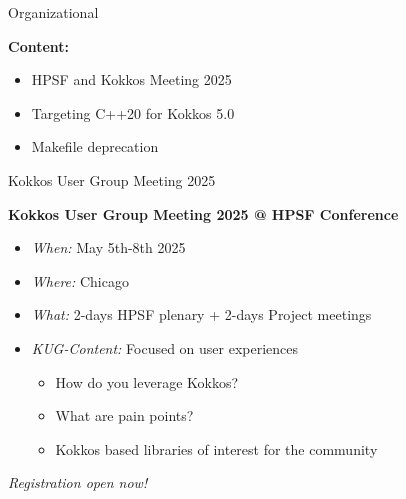

\begin{frame}[fragile]

  {\Huge Organizational}

  \vspace{10pt}

  \textbf{Content:}
  \begin{itemize}
    \item HPSF and Kokkos Meeting 2025
    \item Targeting C++20 for Kokkos 5.0
    \item Makefile deprecation
  \end{itemize}

\end{frame}


\begin{frame}[fragile]{Kokkos User Group Meeting 2025}
\begin{center}
\textbf{Kokkos User Group Meeting 2025 @ HPSF Conference}
\end{center}

\begin{itemize}
\item{\textit{When:} May 5th-8th 2025}
\item{\textit{Where:} Chicago}
\item{\textit{What:} 2-days HPSF plenary + 2-days Project meetings}
\item{\textit{KUG-Content:} Focused on user experiences
\begin{itemize}
   \item{How do you leverage Kokkos?}
   \item{What are pain points?}
   \item{Kokkos based libraries of interest for the community}
\end{itemize}
}
\end{itemize}


\vspace{10pt}

\begin{center}
\textit{Registration open now!}
\end{center}
\end{frame}



